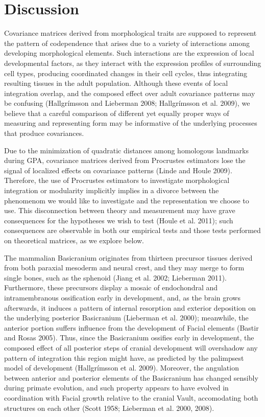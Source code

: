 \documentclass[12pt,]{article}
\begin{document}
\section{Discussion}\label{discussion}

Covariance matrices derived from morphological traits are supposed to
represent the pattern of codependence that arises due to a variety of
interactions among developing morphological elements. Such interactions
are the expression of local developmental factors, as they interact with
the expression profiles of surrounding cell types, producing coordinated
changes in their cell cycles, thus integrating resulting tissues in the
adult population. Although these events of local integration overlap,
and the composed effect over adult covariance patterns may be confusing
(Hallgrímsson and Lieberman 2008; Hallgrímsson et al. 2009), we believe
that a careful comparison of different yet equally proper ways of
measuring and representing form may be informative of the underlying
processes that produce covariances.

Due to the minimization of quadratic distances among homologous
landmarks during GPA, covariance matrices derived from Procrustes
estimators lose the signal of localized effects on covariance patterns
(Linde and Houle 2009). Therefore, the use of Procrustes estimators to
investigate morphological integration or modularity implicitly implies
in a divorce between the phenomenom we would like to investigate and the
representation we choose to use. This disconnection between theory and
measurement may have grave consequences for the hypotheses we wish to
test (Houle et al. 2011); such consequences are observable in both our
empirical tests and those tests performed on theoretical matrices, as we
explore below.

The mammalian Basicranium originates from thirteen precursor tissues
derived from both paraxial mesoderm and neural crest, and they may merge
to form single bones, such as the sphenoid (Jiang et al. 2002; Lieberman
2011). Furthermore, these precursors display a mosaic of endochondral
and intramembranous ossification early in development, and, as the brain
grows afterwards, it induces a pattern of internal resorption and
exterior deposition on the underlying posterior Basicranium (Lieberman
et al. 2000); meanwhile, the anterior portion suffers influence from the
development of Facial elements (Bastir and Rosas 2005). Thus, since the
Basicranium ossifies early in development, the composed effect of all
posterior steps of cranial development will overshadow any pattern of
integration this region might have, as predicted by the palimpsest model
of development (Hallgrímsson et al. 2009). Moreover, the angulation
between anterior and posterior elements of the Basicranium has changed
sensibly during primate evolution, and such property appears to have
evolved in coordination with Facial growth relative to the cranial
Vault, accomodating both structures on each other (Scott 1958; Lieberman
et al. 2000, 2008).
\end{document}
